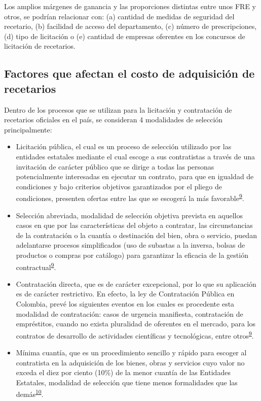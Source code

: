 \documentclass[
]{book}
\begin{document}
Los amplios márgenes de ganancia y las proporciones distintas entre unos FRE y otros, se podrían relacionar con: (a) cantidad de medidas de seguridad del recetario, (b) facilidad de acceso del departamento, (c) número de prescripciones, (d) tipo de licitación o (e) cantidad de empresas oferentes en los concursos de licitación de recetarios.

\hypertarget{factores-que-afectan-el-costo-de-adquisiciuxf3n-de-recetarios}{%
\subsection{Factores que afectan el costo de adquisición de recetarios}\label{factores-que-afectan-el-costo-de-adquisiciuxf3n-de-recetarios}}

Dentro de los procesos que se utilizan para la licitación y contratación de recetarios oficiales en el país, se consideran 4 modalidades de selección principalmente:

\begin{itemize}
\item
  Licitación pública, el cual es un proceso de selección utilizado por las entidades estatales mediante el cual escoge a sus contratistas a través de una invitación de carácter público que se dirige a todas las personas potencialmente interesadas en ejecutar un contrato, para que en igualdad de condiciones y bajo criterios objetivos garantizados por el pliego de condiciones, presenten ofertas entre las que se escogerá la más favorable\textsuperscript{\protect\hyperlink{ref-MinisteriodeRelacionesExteriores2014}{9}}.
\item
  Selección abreviada, modalidad de selección objetiva prevista en aquellos casos en que por las características del objeto a contratar, las circunstancias de la contratación o la cuantía o destinación del bien, obra o servicio, puedan adelantarse procesos simplificados (uso de subastas a la inversa, bolsas de productos o compras por catálogo) para garantizar la eficacia de la gestión contractual\textsuperscript{\protect\hyperlink{ref-MinisteriodeRelacionesExteriores2014}{9}}.
\item
  Contratación directa, que es de carácter excepcional, por lo que su aplicación es de carácter restrictivo. En efecto, la ley de Contratación Pública en Colombia, prevé los siguientes eventos en los cuales es procedente esta modalidad de contratación: casos de urgencia manifiesta, contratación de empréstitos, cuando no exista pluralidad de oferentes en el mercado, para los contratos de desarrollo de actividades científicas y tecnológicas, entre otros\textsuperscript{\protect\hyperlink{ref-MinisteriodeRelacionesExteriores2014}{9}}.
\item
  Mínima cuantía, que es un procedimiento sencillo y rápido para escoger al contratista en la adquisición de los bienes, obras y servicios cuyo valor no exceda el diez por ciento (10\%) de la menor cuantía de las Entidades Estatales, modalidad de selección que tiene menos formalidades que las demás\textsuperscript{\protect\hyperlink{ref-ColombiaCompraEficiente2019}{10}}.
\end{itemize}
\end{document}
